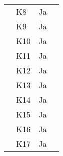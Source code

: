 \documentclass[class=article, crop=false]{standalone}
\begin{document}
\begin{table}[]
\begin{tabular}{llll}
            & K8       & Ja                 &                                                                                                                                                                                                    \\
            & K9       & Ja                 &                                                                                                                                                                                                    \\
            & K10      & Ja                 &                                                                                                                                                                                                    \\
            & K11      & Ja                 &                                                                                                                                                                                                    \\
            & K12      & Ja                 &                                                                                                                                                                                                    \\
            & K13      & Ja                 &                                                                                                                                                                                                    \\
            & K14      & Ja                 &                                                                                                                                                                                                    \\
            & K15      & Ja                 &                                                                                                                                                                                                    \\
            & K16      & Ja                 &                                                                                                                                                                                                    \\
            & K17      & Ja                 &                                                                                                                                                                                                    \\

\end{tabular}
\end{table}
\end{document}
